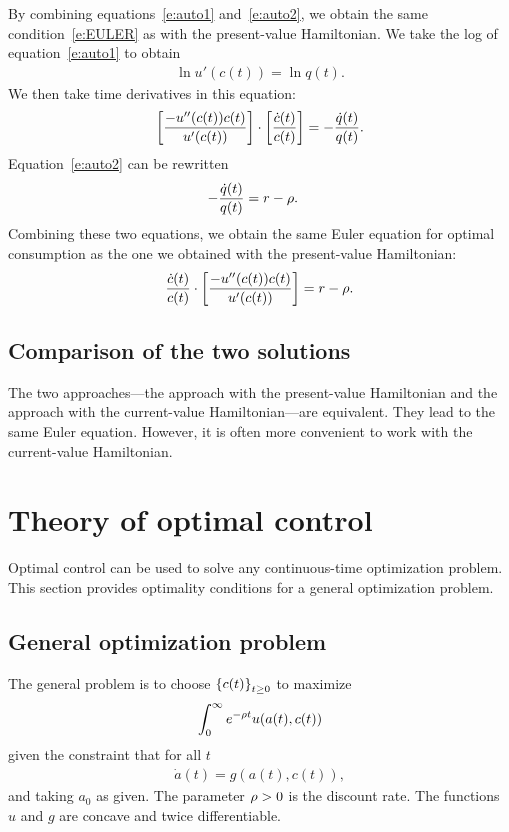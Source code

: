 \documentclass[letterpaper, 11pt, leqno]{article}
\begin{document}
By combining equations~\eqref{e:auto1} and~\eqref{e:auto2}, we obtain the same condition~\eqref{e:EULER} as with the present-value Hamiltonian. We take the log of equation~\eqref{e:auto1} to obtain
\begin{align*}
\ln{u'(c(t))} = \ln{q(t)}.
\end{align*}
We then take time derivatives in this equation:
\begin{equation*}
\left[ \frac{-u''(c(t)) c(t)}{u'(c(t))} \right]\cdot \left[ \frac{\dot{c}(t)}{c(t)} \right] =-\frac{\dot{q}(t)}{q(t)}.
\end{equation*}
Equation~\eqref{e:auto2} can be rewritten
\begin{align*}
-\frac{\dot{q}(t)}{q(t)}&= r-\rho.
\end{align*}
Combining these two equations, we obtain the same Euler equation for optimal consumption as the one we obtained with the present-value Hamiltonian:
\begin{equation*}
\frac{\dot{c}(t)}{c(t)}\cdot \left[ \frac{-u''(c(t)) c(t)}{u'(c(t))} \right] =r-\rho.
\end{equation*}

\subsection{Comparison of the two solutions}

The two approaches---the approach with the present-value Hamiltonian and the approach with the current-value Hamiltonian---are equivalent. They lead to the same Euler equation. However, it is often more convenient to work with the current-value Hamiltonian.

\section{Theory of optimal control}

Optimal control can be used to solve any continuous-time optimization problem. This section provides optimality conditions for a general optimization problem.

\subsection{General optimization problem}

The general problem is to choose $\left\lbrace c(t) \right\rbrace_{t\ge 0}$ to maximize
\begin{align}
\int_{0}^{\infty} e^{-\rho t} u(a(t),c(t))\label{dpc} 
\end{align}
given the constraint that for all $t$
\begin{align}
\dot{a}(t) = g(a(t),c(t)),\label{e:thelaw}
\end{align}
and taking $a_{0}$ as given. The parameter $\rho >0$ is the discount rate. The functions $u$ and $g$ are concave and twice differentiable.
\end{document}
